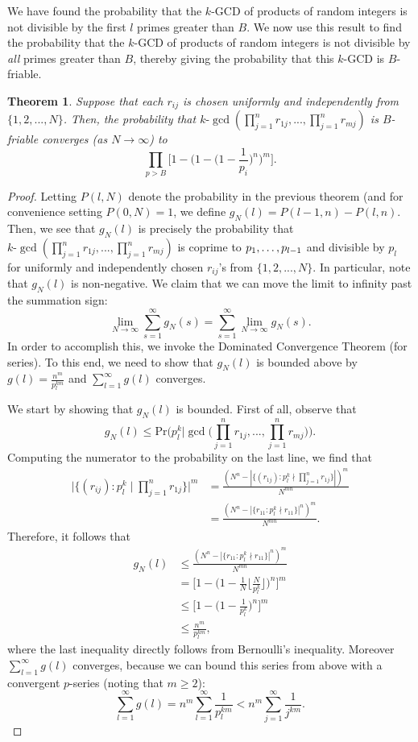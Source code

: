 \documentclass[12pt]{amsart}
\newtheorem{theorem}{Theorem}[subsection]
\theoremstyle{definition}
\begin{document}
We have found the probability that the $k$-GCD of products of random integers is not divisible by the first \(l\) primes greater than \(B\). We now use this result to find the probability that the $k$-GCD of products of random integers is not divisible by \textit{all} primes greater than $B$, thereby giving the probability that this $k$-GCD is $B$-friable.

\begin{theorem} Suppose that each $r_{ij}$ is chosen uniformly and independently from $\{1, 2, ..., N\}$. Then, the probability that $k\text{-}\gcd(\prod_{j=1}^n r_{1j}, ... , \prod_{j=1}^n r_{mj})$ is $B$-friable converges (as $N \to \infty$) to
	$$\prod_{p>B} \Big[1 - \Big(1 - \Big(1-\frac{1}{p_i}\Big)^n\Big)^m\Big].$$
\end{theorem}

\begin{proof}
	Letting $P(l, N)$ denote the probability in the previous theorem (and for convenience setting $P(0, N) = 1$, we define $g_N(l) = P(l-1, n) - P(l, n)$. Then, we see that $g_N(l)$ is precisely the probability that $k\text{-}\gcd(\prod_{j=1}^n r_{1j}, ... , \prod_{j=1}^n r_{mj})$ is coprime to $p_1, \mathellipsis, p_{l-1}$ and divisible by $p_l$ for uniformly and independently chosen $r_{ij}$'s from $\{1, 2, ..., N\}$. In particular, note that $g_N(l)$ is non-negative. We claim that we can move the limit to infinity past the summation sign:
	$$\lim_{N \to \infty} \sum_{s=1}^{\infty} g_N(s) = \sum_{s=1}^{\infty} \lim_{N \to \infty} g_N(s).$$
	In order to accomplish this, we invoke the Dominated Convergence Theorem (for series). To this end, we need to show that $g_N(l)$ is bounded above by $g(l) = \frac{n^m}{p_{l}^{km}}$ and $\sum_{l=1}^{\infty} g(l)$ converges.
	
	We start by showing that $g_N(l)$ is bounded. First of all, observe that
	$$g_N(l) \leq \text{Pr}\Big(p_l^k \Big| \gcd\Big(\prod_{j=1}^n r_{1j}, ... , \prod_{j=1}^n r_{mj}\Big)\Big).$$
	Computing the numerator to the probability on the last line, we find that
	\begin{align*} 
		\Big|\{(r_{ij}) : p_l^k \mid \prod_{j=1}^n r_{1j}\}\Big|^m &= \frac{(N^n - |\{(r_{1j}) : p_l^k \nmid \prod_{j=1}^n r_{1j}\}|)^m}{N^{mn}}\\
		&= \frac{(N^n - |\{r_{11} : p_l^k \nmid r_{11}\}|^n)^m}{N^{mn}}. \end{align*}
	Therefore, it follows that
	\begin{align*} 
		g_N(l) &\leq \frac{(N^n - |\{r_{11} : p_l^k \nmid r_{11}\}|^n)^m}{N^{mn}}\\
		&= \Big[1 - \Big(1 - \frac{1}{N} \Big\lfloor \frac{N}{p_l^k}\Big\rfloor\Big)^n\Big]^m\\
		&\leq \Big[1 - \Big(1 - \frac{1}{p_l^k}\Big)^n\Big]^m\\
        &\leq \frac{n^m}{p_l^{km}},\end{align*}
	where the last inequality directly follows from Bernoulli's inequality. Moreover $\sum_{l=1}^{\infty} g(l)$ converges, because we can bound this series from above with a convergent $p$-series (noting that $m \geq 2$):
	$$\sum_{l=1}^{\infty} g(l) = n^m \sum_{l=1}^{\infty} \frac{1}{p_l^{km}} < n^m \sum_{j=1}^{\infty} \frac{1}{j^{km}}.$$
	

\end{proof}
\end{document}
